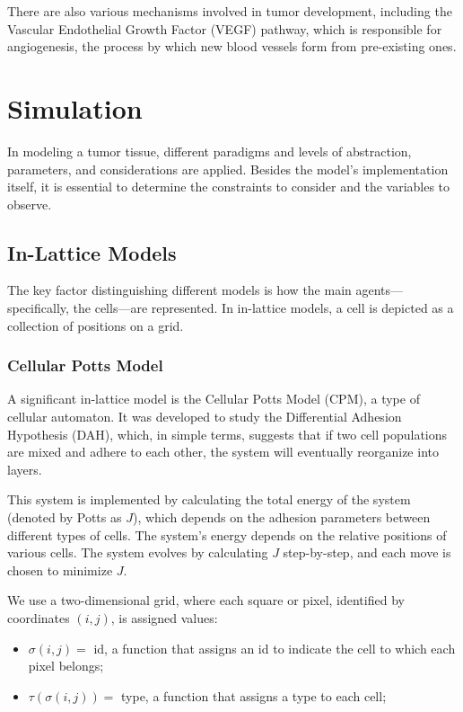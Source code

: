 There are also various mechanisms involved in tumor development, including the Vascular 
Endothelial Growth Factor (VEGF) pathway, which is responsible for angiogenesis, the process 
by which new blood vessels form from pre-existing ones.

\section{Simulation}
In modeling a tumor tissue, different paradigms and levels of abstraction, parameters, and considerations are applied. Besides the model’s implementation itself, it is essential to determine the constraints to consider and the variables to observe.

\subsection{In-Lattice Models}
The key factor distinguishing different models is how the main agents—specifically, the cells—are represented. In in-lattice models, a cell is depicted as a collection of positions on a grid.

\subsubsection{Cellular Potts Model}
A significant in-lattice model is the Cellular Potts Model (CPM), a type of cellular automaton. It was developed to study the Differential Adhesion Hypothesis (DAH), which, in simple terms, suggests that if two cell populations are mixed and adhere to each other, the system will eventually reorganize into layers.

This system is implemented by calculating the total energy of the system (denoted by Potts as $J$), which depends on the adhesion parameters between different types of cells. The system's energy depends on the relative positions of various cells. The system evolves by calculating $J$ step-by-step, and each move is chosen to minimize $J$.

We use a two-dimensional grid, where each square or pixel, identified by coordinates \((i, j)\), is assigned values:
\begin{itemize}
    \item \(\sigma(i,j) =\) id, a function that assigns an id to indicate the cell to which each pixel belongs;
    \item \(\tau(\sigma(i,j)) =\) type, a function that assigns a type to each cell;
\end{itemize}

